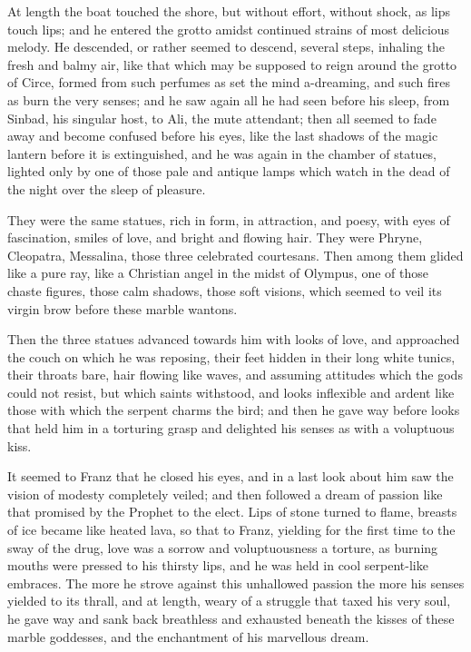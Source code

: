  At length the boat touched the shore, but without effort, without shock, as lips touch lips; and he entered the grotto amidst continued strains of most delicious melody. He descended, or rather seemed to descend, several steps, inhaling the fresh and balmy air, like that which may be supposed to reign around the grotto of Circe, formed from such perfumes as set the mind a-dreaming, and such fires as burn the very senses; and he saw again all he had seen before his sleep, from Sinbad, his singular host, to Ali, the mute attendant; then all seemed to fade away and become confused before his eyes, like the last shadows of the magic lantern before it is extinguished, and he was again in the chamber of statues, lighted only by one of those pale and antique lamps which watch in the dead of the night over the sleep of pleasure. 

 They were the same statues, rich in form, in attraction, and poesy, with eyes of fascination, smiles of love, and bright and flowing hair. They were Phryne, Cleopatra, Messalina, those three celebrated courtesans. Then among them glided like a pure ray, like a Christian angel in the midst of Olympus, one of those chaste figures, those calm shadows, those soft visions, which seemed to veil its virgin brow before these marble wantons. 

 Then the three statues advanced towards him with looks of love, and approached the couch on which he was reposing, their feet hidden in their long white tunics, their throats bare, hair flowing like waves, and assuming attitudes which the gods could not resist, but which saints withstood, and looks inflexible and ardent like those with which the serpent charms the bird; and then he gave way before looks that held him in a torturing grasp and delighted his senses as with a voluptuous kiss. 

 It seemed to Franz that he closed his eyes, and in a last look about him saw the vision of modesty completely veiled; and then followed a dream of passion like that promised by the Prophet to the elect. Lips of stone turned to flame, breasts of ice became like heated lava, so that to Franz, yielding for the first time to the sway of the drug, love was a sorrow and voluptuousness a torture, as burning mouths were pressed to his thirsty lips, and he was held in cool serpent-like embraces. The more he strove against this unhallowed passion the more his senses yielded to its thrall, and at length, weary of a struggle that taxed his very soul, he gave way and sank back breathless and exhausted beneath the kisses of these marble goddesses, and the enchantment of his marvellous dream. 